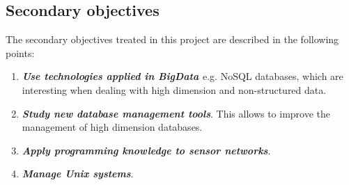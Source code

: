 \subsection{Secondary objectives}

The secondary objectives treated in this project are described in the following points:

\begin{enumerate}

\item \textbf{\textit{Use technologies applied in BigData \cite{noauthor_que_2012, powerdata_big_nodate, noauthor_how_2015}}} e.g. NoSQL \cite{noauthor_concepto_nodate, noauthor_nosql_2015, noauthor_nosql_nodate} databases, which are interesting when dealing with high dimension and non-structured data.

\item \textbf{\textit{Study new database management tools}}. This allows to improve the management of high dimension databases.

\item \textbf{\textit{Apply programming knowledge to sensor networks}}.

\item \textbf{\textit{Manage Unix systems}}.

\end{enumerate}






